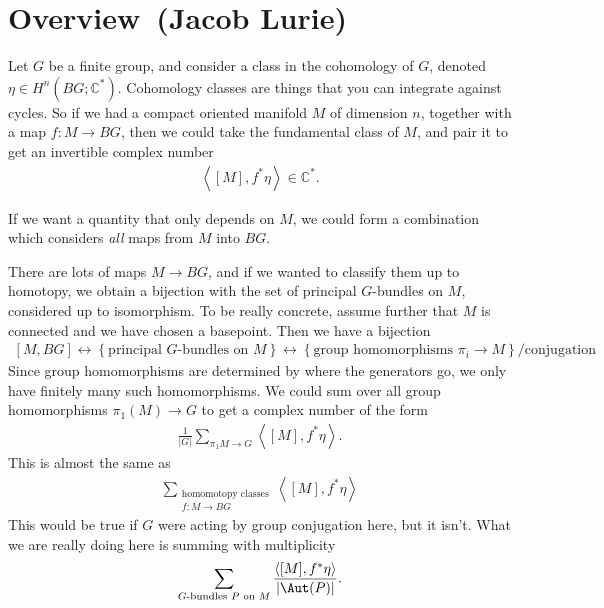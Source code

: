 \renewcommand{\thespeaker}{Jacob Lurie}
\renewcommand{\thetitle}{Overview}
\section{\thetitle~(\thespeaker)}


Let $G$ be a finite group, and consider a class in the cohomology of $G$, denoted $\eta \in H^n(BG; \mathbb{C}^\ast)$. Cohomology classes are things that you can integrate against cycles. So if we had a compact oriented manifold $M$ of dimension $n$, together with a map $f: M \to BG$, then we could take the fundamental class of $M$, and pair it to get an invertible complex number
\begin{align*}
    \left\langle [M], f^\ast \eta \right\rangle \in \mathbb{C}^\ast.
\end{align*}

If we want a quantity that only depends on $M$, we could form a combination which considers \textit{all} maps from $M$ into $BG$.

There are lots of maps $M \to BG$, and if we wanted to classify them up to homotopy, we obtain a bijection with the set of principal $G$-bundles on $M$, considered up to isomorphism. To be really concrete, assume further that $M$ is connected and we have chosen a basepoint. Then we have a bijection
\begin{align*}
    \left[ M, BG \right] \leftrightarrow \left\{ \text{principal } G \text{-bundles on } M \right\} \leftrightarrow \left\{ \text{group homomorphisms } \pi_i \to M \right\}/\text{conjugation}
\end{align*}
Since group homomorphisms are determined by where the generators go, we only have finitely many such homomorphisms. We could sum over all group homomorphisms $\pi_1(M) \to G$ to get a complex number of the form
\begin{align*}
    \frac{1}{|G|} \sum_{\pi_1 M \to G} \left\langle [M], f^\ast \eta \right\rangle.
\end{align*}
This is almost the same as
\begin{align*}
    \sum_{\substack{\text{homomotopy classes} \\ f: M \to BG}} \left\langle [M], f^\ast \eta \right\rangle
\end{align*}
This would be true if $G$ were acting by group conjugation here, but it isn't. What we are really doing here is summing with multiplicity
\begin{align*}
    \sum_{G\text{-bundles } P\text{ on } M} \frac{\left\langle [M], f^\ast \eta \right\rangle}{\left| \Aut(P) \right|}.
\end{align*}

